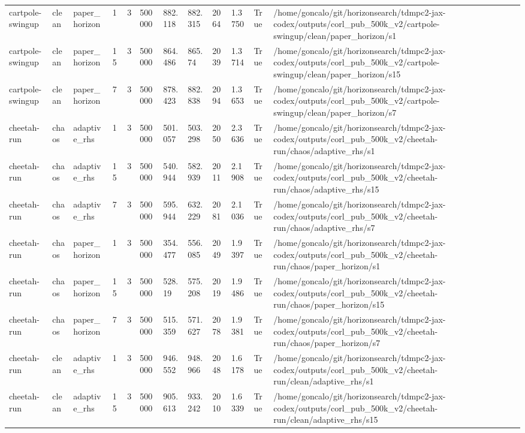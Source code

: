 \begin{tabular}{llllllllllll}
cartpole-swingup & clean & paper\_horizon & 1 & 3 & 500000 & 882.118 & 882.315 & 2064 & 1.3750 & True & /home/goncalo/git/horizonsearch/tdmpc2-jax-codex/outputs/corl\_pub\_500k\_v2/cartpole-swingup/clean/paper\_horizon/s1 \\
cartpole-swingup & clean & paper\_horizon & 15 & 3 & 500000 & 864.486 & 865.74 & 2039 & 1.3714 & True & /home/goncalo/git/horizonsearch/tdmpc2-jax-codex/outputs/corl\_pub\_500k\_v2/cartpole-swingup/clean/paper\_horizon/s15 \\
cartpole-swingup & clean & paper\_horizon & 7 & 3 & 500000 & 878.423 & 882.838 & 2094 & 1.3653 & True & /home/goncalo/git/horizonsearch/tdmpc2-jax-codex/outputs/corl\_pub\_500k\_v2/cartpole-swingup/clean/paper\_horizon/s7 \\
cheetah-run & chaos & adaptive\_rhs & 1 & 3 & 500000 & 501.057 & 503.298 & 2050 & 2.3636 & True & /home/goncalo/git/horizonsearch/tdmpc2-jax-codex/outputs/corl\_pub\_500k\_v2/cheetah-run/chaos/adaptive\_rhs/s1 \\
cheetah-run & chaos & adaptive\_rhs & 15 & 3 & 500000 & 540.944 & 582.939 & 2011 & 2.1908 & True & /home/goncalo/git/horizonsearch/tdmpc2-jax-codex/outputs/corl\_pub\_500k\_v2/cheetah-run/chaos/adaptive\_rhs/s15 \\
cheetah-run & chaos & adaptive\_rhs & 7 & 3 & 500000 & 595.944 & 632.229 & 2081 & 2.1036 & True & /home/goncalo/git/horizonsearch/tdmpc2-jax-codex/outputs/corl\_pub\_500k\_v2/cheetah-run/chaos/adaptive\_rhs/s7 \\
cheetah-run & chaos & paper\_horizon & 1 & 3 & 500000 & 354.477 & 556.085 & 2049 & 1.9397 & True & /home/goncalo/git/horizonsearch/tdmpc2-jax-codex/outputs/corl\_pub\_500k\_v2/cheetah-run/chaos/paper\_horizon/s1 \\
cheetah-run & chaos & paper\_horizon & 15 & 3 & 500000 & 528.19 & 575.208 & 2019 & 1.9486 & True & /home/goncalo/git/horizonsearch/tdmpc2-jax-codex/outputs/corl\_pub\_500k\_v2/cheetah-run/chaos/paper\_horizon/s15 \\
cheetah-run & chaos & paper\_horizon & 7 & 3 & 500000 & 515.359 & 571.627 & 2078 & 1.9381 & True & /home/goncalo/git/horizonsearch/tdmpc2-jax-codex/outputs/corl\_pub\_500k\_v2/cheetah-run/chaos/paper\_horizon/s7 \\
cheetah-run & clean & adaptive\_rhs & 1 & 3 & 500000 & 946.552 & 948.966 & 2048 & 1.6178 & True & /home/goncalo/git/horizonsearch/tdmpc2-jax-codex/outputs/corl\_pub\_500k\_v2/cheetah-run/clean/adaptive\_rhs/s1 \\
cheetah-run & clean & adaptive\_rhs & 15 & 3 & 500000 & 905.613 & 933.242 & 2010 & 1.6339 & True & /home/goncalo/git/horizonsearch/tdmpc2-jax-codex/outputs/corl\_pub\_500k\_v2/cheetah-run/clean/adaptive\_rhs/s15 \\

\end{tabular}
